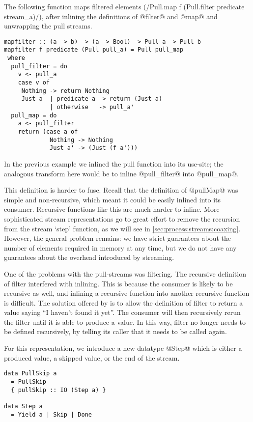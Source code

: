 The following function maps filtered elements (\Hs/Pull.map f (Pull.filter predicate stream_a)/), after inlining the definitions of @filter@ and @map@ and unwrapping the pull streams.

\begin{lstlisting}
mapfilter :: (a -> b) -> (a -> Bool) -> Pull a -> Pull b
mapfilter f predicate (Pull pull_a) = Pull pull_map
 where
  pull_filter = do
    v <- pull_a
    case v of
     Nothing -> return Nothing
     Just a  | predicate a -> return (Just a)
             | otherwise   -> pull_a'
  pull_map = do
    a <- pull_filter
    return (case a of
             Nothing -> Nothing
             Just a' -> (Just (f a')))
\end{lstlisting}

In the previous example we inlined the pull function into its use-site; the analogous transform here would be to inline @pull_filter@ into @pull_map@.

This definition is harder to fuse. Recall that the definition of @pullMap@ was simple and non-recursive, which meant it could be easily inlined into its consumer.
Recursive functions like this are much harder to inline.
More sophisticated stream representations go to great effort to remove the recursion from the stream `step' function, as we will see in \autoref{sec:process:streams:coaxing}.
However, the general problem remains: we have strict guarantees about the number of elements required in memory at any time, but we do not have any guarantees about the overhead introduced by streaming.

One of the problems with the pull-streams was filtering.
The recursive definition of filter interfered with inlining.
This is because the consumer is likely to be recursive as well, and inlining a recursive function into another recursive function is difficult.
The solution offered by \citet{coutts2007stream} is to allow the definition of filter to return a value saying ``I haven't found it yet''.
The consumer will then recursively rerun the filter until it is able to produce a value.
In this way, filter no longer needs to be defined recursively, by telling its caller that it needs to be called again.

For this representation, we introduce a new datatype @Step@ which is either a produced value, a skipped value, or the end of the stream.

\begin{lstlisting}
data PullSkip a
  = PullSkip
  { pullSkip :: IO (Step a) }

data Step a
  = Yield a | Skip | Done
\end{lstlisting}

